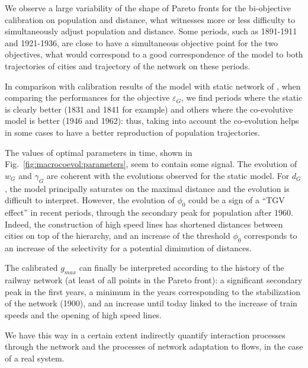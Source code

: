 \documentclass[11pt]{article}
\begin{document}
We observe a large variability of the shape of Pareto fronts for the bi-objective calibration on population and distance, what witnesses more or less difficulty to simultaneously adjust population and distance. Some periods, such as 1891-1911 and 1921-1936, are close to have a simultaneous objective point for the two objectives, what would correspond to a good correspondence of the model to both trajectories of cities and trajectory of the network on these periods. 

In comparison with calibration results of the model with static network of \cite{raimbault2018indirect}, when comparing the performances for the objective $\varepsilon_G$, we find periods where the static is clearly better (1831 and 1841 for example) and others where the co-evolutive model is better (1946 and 1962): thus, taking into account the co-evolution helps in some cases to have a better reproduction of population trajectories.


The values of optimal parameters in time, shown in Fig.~\ref{fig:macrocoevol:parameters}, seem to contain some signal. The evolution of $w_G$ and $\gamma_G$ are coherent with the evolutions observed for the static model. For $d_G$, the model principally saturates on the maximal distance and the evolution is difficult to interpret. However, the evolution of $\phi_0$ could be a sign of a ``TGV effect'' in recent periods, through the secondary peak for population after 1960. Indeed, the construction of high speed lines has shortened distances between cities on top of the hierarchy, and an increase of the threshold $\phi_0$ corresponds to an increase of the selectivity for a potential diminution of distances.


The calibrated $g_{max}$ can finally be interpreted according to the history of the railway network (at least of all points in the Pareto front): a significant secondary peak in the first years, a minimum in the years corresponding to the stabilization of the network (1900), and an increase until today linked to the increase of train speeds and the opening of high speed lines. 


We have this way in a certain extent indirectly quantify interaction processes through the network and the processes of network adaptation to flows, in the case of a real system.
\end{document}
